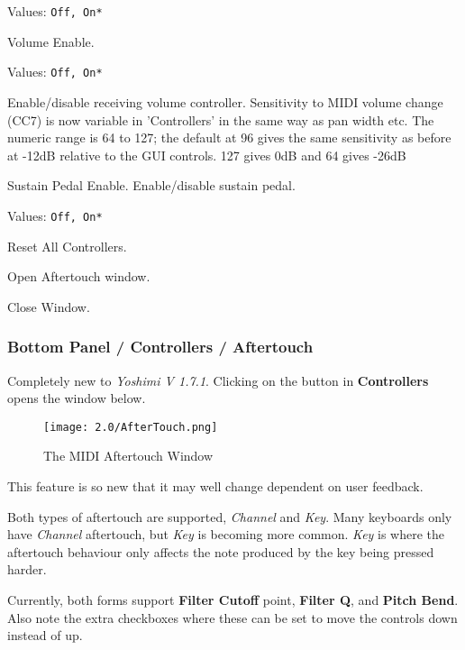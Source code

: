    Values: \texttt{Off, On*}

   Volume Enable.

   Values: \texttt{Off, On*}

   Enable/disable receiving volume controller.
   Sensitivity to MIDI volume change (CC7) is now variable in 'Controllers'
   in the same way as pan width etc. The numeric range is 64 to 127; the
   default at 96 gives the same sensitivity as before at -12dB relative to
   the GUI controls. 127 gives 0dB and 64 gives -26dB

   Sustain Pedal Enable.
   Enable/disable sustain pedal.

   Values: \texttt{Off, On*}

   Reset All Controllers.

   Open Aftertouch window.

   Close Window.

\subsubsection{Bottom Panel / Controllers / Aftertouch}
\label{subsubsec:bottom_panel_controllers_aftertouch}

   Completely new to \textsl{Yoshimi V 1.7.1}. Clicking on the button
   in \textbf{Controllers} opens the window below.

\begin{figure}[H]
   \centering
   \texttt{[image: 2.0/AfterTouch.png]}
   \caption{The MIDI Aftertouch Window}
   \label{fig:instrument_midi_aftertouch}
\end{figure}

This feature is so new that it may well change dependent on user feedback.

Both types of aftertouch are supported, \textsl{Channel} and \textsl{Key}. Many
keyboards only have \textsl{Channel} aftertouch, but \textsl{Key} is becoming
more common. \textsl{Key} is where the aftertouch
behaviour only affects the note produced by the key being pressed harder.

Currently, both forms support \textbf{Filter Cutoff} point,
\textbf{Filter Q}, and
\textbf{Pitch Bend}. Also note the extra checkboxes where these can be set to
move the controls down instead of up.

